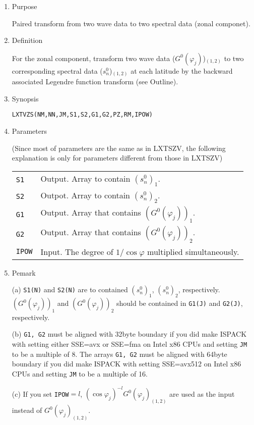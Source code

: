 \documentclass[a4paper]{scrartcl}
\begin{document}
\begin{enumerate}

\item Purpose

Paired transform from two wave data to two spectral data (zonal componet).

\item Definition

For the zonal component, transform two wave data ($G^0(\varphi_j)$)$_{(1,2)}$
to two corresponding spectral data ($s^0_n$)$_{(1,2)}$ at each latitude
by the backward associated Legendre function transform (see Outline).

\item Synopsis 

\texttt{LXTVZS(NM,NN,JM,S1,S2,G1,G2,PZ,RM,IPOW)}

\item Parameters

(Since most of parameters are the same as in LXTSZV,
the following explanation is only for parameters
different from those in LXTSZV)
  
\begin{tabular}{ll}
\texttt{S1} & Output. Array to contain $(s^0_n)_1$.\\
\texttt{S2} & Outpot. Array to contain $(s^0_n)_2$.\\
\texttt{G1} & Output. Array that contains $(G^0(\varphi_j))_1$.\\
\texttt{G2} & Output. Array that contains $(G^0(\varphi_j))_2$.\\
\texttt{IPOW} & Input. 
The degree of $1/\cos\varphi$ multiplied 
simultaneously.\\
\end{tabular}

\item Pemark

(a) \texttt{S1(N)} and \texttt{S2(N)} are to contained 
$(s^0_n)_1$, $(s^0_n)_2$, respectively.
$(G^0(\varphi_j))_1$ and 
$(G^0(\varphi_j))_2$ 
should be contained in \texttt{G1(J)} and \texttt{G2(J)}, respectively.
  
(b) \texttt{G1, G2}
must be aligned with 32byte boundary
if you did make ISPACK with setting either SSE=avx or SSE=fma
on Intel x86 CPUs and setting \texttt{JM} to be a multiple of 8.
The arrays \texttt{G1, G2} must be aligned with 64byte boundary
if you did make ISPACK with setting SSE=avx512
on Intel x86 CPUs and setting \texttt{JM} to be a multiple of 16.

(c) If you set \texttt{IPOW}$=l$, 
$(\cos\varphi_j)^{-l}G^0(\varphi_j)_{(1,2)}$ are used
as the input instead of $G^0(\varphi_j)_{(1,2)}$.

\end{enumerate}
\end{document}
